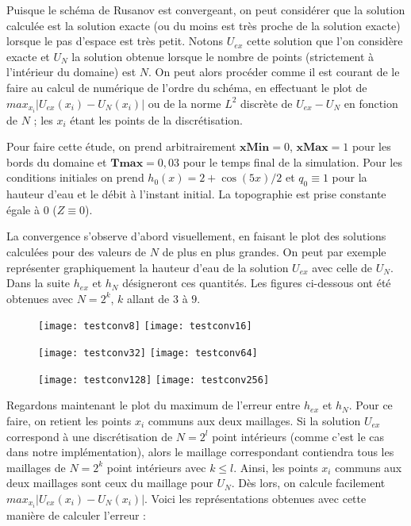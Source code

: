 \documentclass[
11pt, %
francais, %
singlespacing, %
headsepline, %
]{MastersDoctoralThesis} %
\theoremstyle{definition}
\begin{document}
Puisque le schéma de Rusanov est convergeant, on peut considérer que la solution calculée est la solution exacte (ou du moins est très proche de la solution exacte) lorsque le pas d'espace est très petit. Notons $U_{ex}$ cette solution que l'on considère exacte et $U_N$ la solution obtenue lorsque le nombre de points (strictement à l'intérieur du domaine) est $N$. On peut alors procéder comme il est courant de le faire au calcul de numérique de l'ordre du schéma, en effectuant le plot de $max_{x_i}|U_{ex}(x_i)-U_N(x_i)|$ ou de la norme $L^{2}$ discrète de $U_{ex}-U_N$ en fonction de $N$ ; les $x_i$ étant les points de la discrétisation.

Pour faire cette étude, on prend arbitrairement $\textbf{xMin}=0$, $\textbf{xMax}=1$  pour les bords du domaine et $\textbf{Tmax}=0,03$ pour le temps final de la simulation. Pour les conditions initiales on prend $h_{0}(x) = 2+\cos(5x)/2$ et $q_{0}\equiv 1$ pour la hauteur d'eau et le débit à l'instant initial. La topographie est prise constante égale à 0 ($Z\equiv 0$).

La convergence s'observe d'abord visuellement, en faisant le plot des solutions calculées pour des valeurs de $N$ de plus en plus grandes. On peut par exemple représenter graphiquement la hauteur d'eau de la solution $U_{ex}$ avec celle de  $U_N$. Dans la suite $h_{ex}$ et $h_{N}$ désigneront ces quantités. Les figures ci-dessous ont été obtenues avec $N=2^{k}$, $k$ allant de $3$ à $9$.

\begin{figure}
\texttt{[image: testconv8]}
\texttt{[image: testconv16]} 
\end{figure}

\begin{figure}
\texttt{[image: testconv32]}
\texttt{[image: testconv64]} 
\end{figure}

\begin{figure}
\texttt{[image: testconv128]}
\texttt{[image: testconv256]} 
\end{figure}


Regardons maintenant le plot du maximum de l'erreur entre $h_{ex}$ et $h_{N}$. Pour ce faire, on retient les points $x_{i}$ communs aux deux maillages.
Si la solution $U_{ex}$ correspond à une discrétisation de $N=2^{l}$ point intérieurs (comme c'est le cas dans notre implémentation), alors le maillage correspondant contiendra tous les maillages de $N=2^{k}$  point intérieurs avec $k\leq l$. Ainsi, les points $x_{i}$ communs aux deux maillages sont ceux du maillage pour $U_{N}$. Dès lors, on calcule facilement $max_{x_i}|U_{ex}(x_i)-U_N(x_i)|$. Voici les représentations obtenues avec cette manière de calculer l'erreur :
\end{document}
